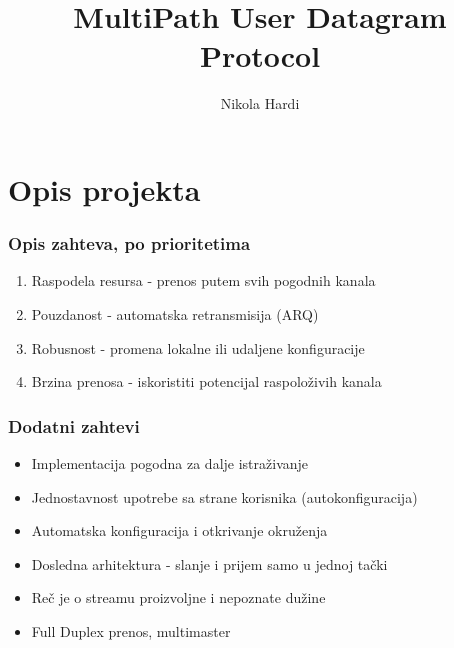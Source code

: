 \documentclass{beamer}
\title{MultiPath User Datagram Protocol}
\author{Nikola Hardi}
\institute{FTN - Fakultet Tehničkih Nauka - Novi Sad}
\begin{document}
    \begin{frame}
        \titlepage
    \end{frame}

\section{Opis projekta}
    \begin{frame}
        \frametitle{Opis zahteva, po prioritetima}

        \begin{enumerate}
            \item{Raspodela resursa - prenos putem svih pogodnih kanala}
            \item{Pouzdanost - automatska retransmisija (ARQ)}
            \item{Robusnost - promena lokalne ili udaljene konfiguracije}
            \item{Brzina prenosa - iskoristiti potencijal raspoloživih kanala}
        \end{enumerate}
    \end{frame}

    \begin{frame}
        \frametitle{Dodatni zahtevi}
        \begin{itemize}
            \item{Implementacija pogodna za dalje istraživanje}
            \item{Jednostavnost upotrebe sa strane korisnika (autokonfiguracija)}
            \item{Automatska konfiguracija i otkrivanje okruženja}
            \item{Dosledna arhitektura - slanje i prijem samo u jednoj tački}
            \item{Reč je o streamu proizvoljne i nepoznate dužine}
            \item{Full Duplex prenos, multimaster}
        \end{itemize}
    \end{frame}
\end{document}
